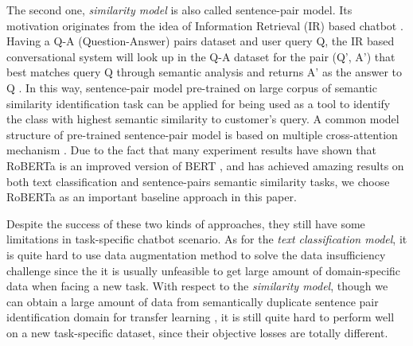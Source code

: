 \documentclass[letterpaper]{article} %
\begin{document}
  The  second  one,  \emph{similarity model} is also called sentence-pair model.
  Its  motivation  originates  from  the idea of Information Retrieval (IR) based
  chatbot   \cite{jafarpour2010filter,   leuski2011npceditor}.   Having   a  Q-A
  (Question-Answer)  pairs dataset and user query Q, the IR based conversational
  system will look up in the Q-A dataset for the pair (Q', A') that best matches
  query  Q  through  semantic  analysis  and  returns  A'  as  the  answer  to Q
  \cite{mnasri2019recent}. In this way, sentence-pair model pre-trained on large
  corpus  of  semantic  similarity  identification task can be applied for being
  used  as  a  tool  to  identify  the class with highest semantic similarity to
  customer's    query.    A    common    model    structure    of    pre-trained 
  sentence-pair model is based on multiple cross-attention
  mechanism  \cite{barkan2020scalable}. Due to
  the   fact   that   many   experiment   results   have   shown   that  RoBERTa
  \cite{liu2019roberta} is an improved version of BERT \cite{devlin2018bert}, and has achieved amazing
  results  on  both  text  classification and sentence-pairs semantic similarity
  tasks, we choose RoBERTa as an important baseline approach in this paper.

  Despite  the  success  of  these two kinds of approaches, they still have some
  limitations   in   task-specific  chatbot  scenario.  As  for  the  \emph{text
  classification  model},  it  is  quite hard to use data augmentation method to
  solve  the  data insufficiency challenge since the it is usually unfeasible to
  get  large amount of domain-specific data when facing a new task. With respect
  to  the  \emph{similarity model}, though we can obtain a large amount of data
  from semantically  duplicate  sentence  pair identification domain for transfer
  learning  \cite{sun2019fine},  it  is  still  quite  hard  to  perform well on
  a new task-specific dataset,  since their objective losses are totally different. 
\end{document}

